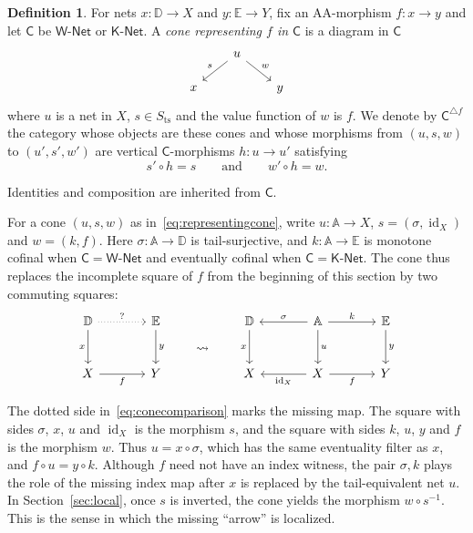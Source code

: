 \documentclass[11pt,a4paper]{article}
\theoremstyle{definition}
\newtheorem{definition}[theorem]{Definition}
\theoremstyle{remark}
\newcommand{\Wpar}{\mathsf{W\text{-}Net}}
\newcommand{\Kpar}{\mathsf{K\text{-}Net}}
\newcommand{\CC}{\mathsf C}
\newcommand{\id}{\operatorname{id}}
\newcommand{\Sts}{S_{\mathrm{ts}}}
\begin{document}
\begin{definition}\label{def:cones}
For nets \(x:\mathbb D\to X\) and \(y:\mathbb E\to Y\), fix an
AA-morphism \(f:x\to y\) and let \(\CC\) be \(\Wpar\) or \(\Kpar\).
A \emph{cone representing \(f\) in \(\CC\)} is a diagram in \(\CC\)
\begin{equation}\label{eq:representingcone}
\begin{tikzcd}[column sep=2em,row sep=1.5em]
& u \arrow[dl,"s"'] \arrow[dr,"w"] & \\
x & & y
\end{tikzcd}
\end{equation}
where \(u\) is a net in \(X\), \(s\in\Sts\) and the value function
of \(w\) is \(f\). We denote by \(\CC^{\triangle f}\) the
category whose objects are these cones and whose morphisms from
\((u,s,w)\) to \((u',s',w')\) are vertical \(\CC\)-morphisms
\(h:u\to u'\) satisfying
\[
 s'\circ h=s \qquad\text{and}\qquad w'\circ h=w.
\]

Identities and composition are inherited from \(\CC\).
\end{definition}

For a cone \((u,s,w)\) as in~\eqref{eq:representingcone}, write
\(u:\mathbb A\to X\), \(s=(\sigma,\id_X)\) and \(w=(k,f)\). Here
\(\sigma:\mathbb A\to\mathbb D\) is tail-surjective, and
\(k:\mathbb A\to\mathbb E\) is monotone cofinal when \(\CC=\Wpar\) and
eventually cofinal when \(\CC=\Kpar\). The cone thus replaces the
incomplete square of \(f\) from the beginning of this section by two
commuting squares:
\begin{equation}\label{eq:conecomparison}
\begin{tikzcd}[column sep=large,row sep=large,baseline={([yshift=-.5ex]current bounding box.center)}]
\mathbb D \arrow[r,dotted,"?"] \arrow[d,"x"'] & \mathbb E \arrow[d,"y"] \\
X \arrow[r,"f"'] & Y
\end{tikzcd}
\qquad\rightsquigarrow\qquad
\begin{tikzcd}[column sep=large,row sep=large,baseline={([yshift=-.5ex]current bounding box.center)}]
\mathbb D \arrow[d,"x"'] &
\mathbb A \arrow[l,"\sigma"'] \arrow[r,"k"] \arrow[d,"u"] &
\mathbb E \arrow[d,"y"] \\
X & X \arrow[l,"\id_X"] \arrow[r,"f"'] & Y
\end{tikzcd}
\end{equation}

The dotted side in~\eqref{eq:conecomparison} marks the missing map. The square with sides \(\sigma\), \(x\), \(u\) and
\(\id_X\) is the morphism \(s\), and the square with sides \(k\),
\(u\), \(y\) and \(f\) is the morphism \(w\). Thus \(u=x\circ\sigma\),
which has the same eventuality filter as \(x\), and
\(f\circ u=y\circ k\). Although \(f\) need not have an index witness,
the pair \(\sigma,k\) plays the role of the missing index map after
\(x\) is replaced by the tail-equivalent net \(u\). In
Section~\ref{sec:local}, once \(s\) is inverted, the cone yields the
morphism \(w\circ s^{-1}\). This is the sense in which the missing
``arrow'' is localized.
\end{document}
